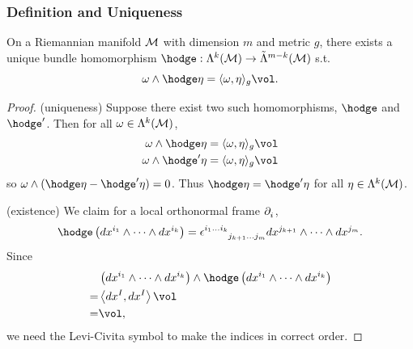 \documentclass[../main.tex]{subfiles}
\begin{document}
    \subsubsection{Definition and Uniqueness}
    \begin{theorem}\label{thm:hodge-star}
        On a Riemannian manifold \(\manifold[M]\) with dimension \(m\) and metric 
        \(g\), there exists a unique bundle homomorphism \(\hodge : \form{k}{M} \to 
        \pseudoform{m-k}{M}\) s.t. 
        \[
        \omega\wedge \hodge \eta=\langle \omega, \eta\rangle_g \vol.
        \]
    \end{theorem}
    \begin{proof}
        (uniqueness) Suppose there exist two such homomorphisms, \(\hodge\) and 
        \(\hodge'\). Then for all \(\omega \in \form{k}{M}\),
        \[
        \begin{aligned}
            \omega\wedge \hodge \eta&=\langle \omega, \eta\rangle_g \vol\\
            \omega\wedge \hodge' \eta&=\langle \omega, \eta\rangle_g \vol
        \end{aligned}
        \]
        so \(\omega\wedge (\hodge\eta-\hodge'\eta)=0\). Thus 
        \(\hodge\eta=\hodge'\eta\) for all \(\eta \in \form{k}{M}\).\par
        (existence) We claim for a local orthonormal frame \(\tfld{i}\), 
        \[
        \hodge \left(dx^{i_1}\wedge \dots\wedge dx^{i_k}\right)
        =\epsilon\indices{^{i_1}^{\dots}^{i_k}_{j_{k+1}}_{\dots}_{j_m}}
        dx^{j_{k+1}}\wedge\dots\wedge dx^{j_m}.
        \]
        Since 
        \[
        \begin{aligned}
            &\left(dx^{i_1}\wedge \dots\wedge dx^{i_k}\right)\wedge 
            \hodge \left(dx^{i_1}\wedge \dots\wedge dx^{i_k}\right)\\
            =& \left<dx^I, dx^I\right>\vol\\
            =& \vol,
        \end{aligned}
        \]
        we need the Levi-Civita symbol to make the indices in correct order.
    \end{proof}
\end{document}
